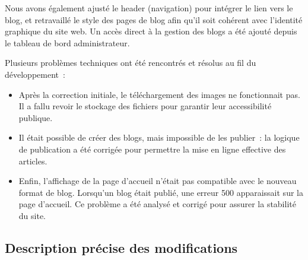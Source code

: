 \documentclass[a4paper,12pt]{report}
\begin{document}
Nous avons également ajusté le header (navigation) pour intégrer le lien vers le blog, et retravaillé le style des pages de blog afin qu’il soit cohérent avec l’identité graphique du site web. Un accès direct à la gestion des blogs a été ajouté depuis le tableau de bord administrateur.

Plusieurs problèmes techniques ont été rencontrés et résolus au fil du développement :
\begin{itemize}
    \item Après la correction initiale, le téléchargement des images ne fonctionnait pas. Il a fallu revoir le stockage des fichiers pour garantir leur accessibilité publique.
    \item Il était possible de créer des blogs, mais impossible de les publier : la logique de publication a été corrigée pour permettre la mise en ligne effective des articles.
    \item Enfin, l’affichage de la page d’accueil n’était pas compatible avec le nouveau format de blog. Lorsqu’un blog était publié, une erreur 500 apparaissait sur la page d’accueil. Ce problème a été analysé et corrigé pour assurer la stabilité du site.
\end{itemize}

\subsection{Description précise des modifications}
\end{document}
